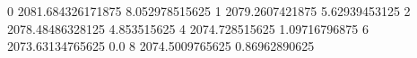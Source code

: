 0 2081.684326171875 8.052978515625
1 2079.2607421875 5.62939453125
2 2078.48486328125 4.853515625
4 2074.728515625 1.09716796875
6 2073.63134765625 0.0
8 2074.5009765625 0.86962890625
